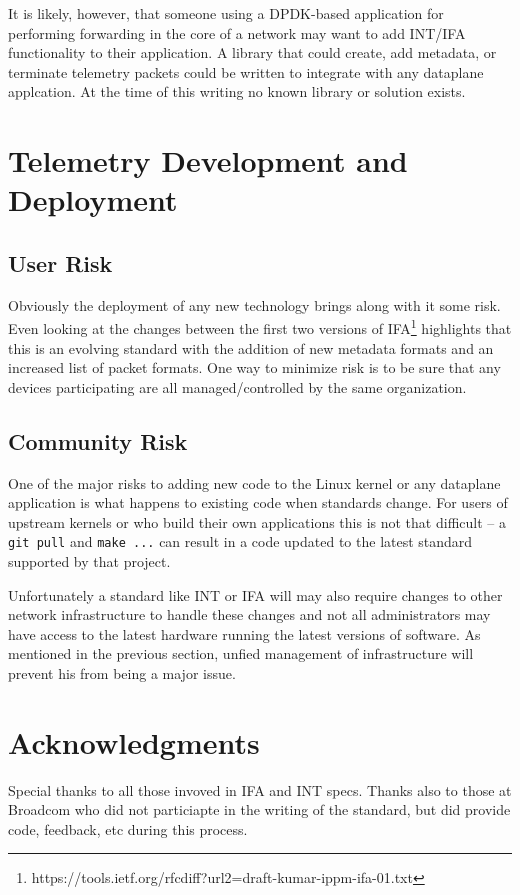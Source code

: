 \documentclass[letterpaper,twocolumn,10pt]{article}
\begin{document}
It is likely, however, that someone using a DPDK-based application for
performing forwarding in the core of a network may want to add INT/IFA
functionality to their application.  A library that could create, add
metadata, or terminate telemetry packets could be written to integrate
with any dataplane applcation.  At the time of this writing no known
library or solution exists.

\section{Telemetry Development and Deployment}

\subsection{User Risk}

Obviously the deployment of any new technology brings along with it some
risk.  Even looking at the changes between the first two versions of
IFA\footnote{https://tools.ietf.org/rfcdiff?url2=draft-kumar-ippm-ifa-01.txt} 
highlights that this is an evolving standard with the addition of new
metadata formats and an increased list of packet formats.  One way to
minimize risk is to be sure that any devices participating are all
managed/controlled by the same organization.

\subsection{Community Risk}

One of the major risks to adding new code to the Linux kernel or any
dataplane application is what happens to existing code when standards
change.  For users of upstream kernels or who build their own
applications this is not that difficult -- a \texttt{git pull} and
\texttt{make ...} can result in a code updated to the latest standard
supported by that project.

Unfortunately a standard like INT or IFA will may also require changes
to other network infrastructure to handle these changes and not all
administrators may have access to the latest hardware running the latest
versions of software.  As mentioned in the previous section, unfied
management of infrastructure will prevent his from being a major issue.

\section{Acknowledgments}

Special thanks to all those invoved in IFA and INT specs.  Thanks also
to those at Broadcom who did not particiapte in the writing of the
standard, but did provide code, feedback, etc during this process.

{\normalsize 
}
\end{document}
